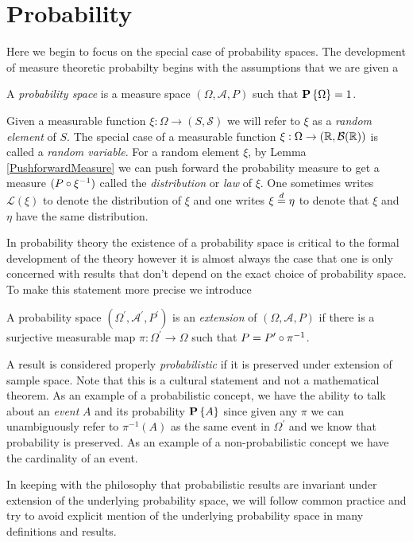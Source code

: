 \chapter{Probability}
Here we begin to focus on the special case of probability spaces.  The
development of measure theoretic probabilty begins with the
assumptions that we are given a
\begin{defn}A \emph{probability space} is a measure space $(\Omega,
  \mathcal{A}, P)$ such that $\textbf{P}\left \{\Omega \right \} = 1$.
\end{defn}
Given a measurable function $\xi : \Omega \to (S,
\mathcal{S})$ we will refer to $\xi$ as a \emph{random
  element} of $S$.  The special case of a measurable function $\xi : \Omega \to (\mathbb{R}, \mathcal{B}(\mathbb{R}))$
is called a \emph{random variable}.  For a random element $\xi$, by
Lemma \ref{PushforwardMeasure} we can
push forward the probability measure to get a measure $(P \circ \xi^{-1})$ called the \emph{distribution} or \emph{law} of $\xi$. One
sometimes writes $\mathcal{L}(\xi)$ to denote the distribution of
$\xi$ and one writes $\xi \overset{d}= \eta$ to denote that $\xi$ and $\eta$ have
the same distribution. 

In probability theory the existence of a probability space is critical
to the formal development of the theory however it is almost always
the case that one is only concerned with results that don't depend on
the exact choice of probability space.  To make this statement more
precise we introduce 
\begin{defn}A probability space $(\Omega^\prime, \mathcal{A}^\prime,
  P^\prime)$ is an \emph{extension} of $(\Omega, \mathcal{A},
  P)$ if there is a surjective measurable map $\pi : \Omega^\prime \to
  \Omega$ such that $P = P^\prime \circ \pi^{-1}$.
\end{defn}

A result is considered properly \emph{probabilistic} if it is
preserved under extension of sample space.  Note that this is a
cultural statement and not a mathematical theorem.  As an example of a
probabilistic concept, we have the ability to talk about an
\emph{event} $A$ and its probability $\textbf{P}\left \{A \right \}$ since given any
$\pi$  we can unambiguously refer to $\pi^{-1}(A)$ as the same event
in $\Omega^\prime$ and we know that probability is preserved.  As an
example of a non-probabilistic concept we have the cardinality of an
event.

In keeping with the philosophy that probabilistic results are
invariant under extension of the underlying probability space, we will
follow common practice and try to avoid explicit mention of the underlying
probability space in many definitions and results.  

